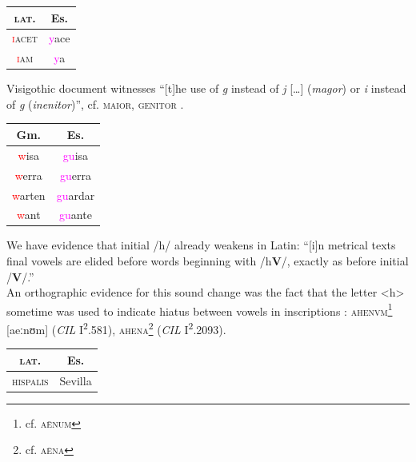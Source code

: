 \documentclass{report}[12pt]
\begin{document}
\begin{tabular}{c c}
  \textsc{lat.} & Es. \\
  \hline
  \textsc{\textcolor{red}{i}acet} & \textcolor{magenta}{y}ace \\
  \textsc{\textcolor{red}{i}am} & \textcolor{magenta}{y}a \\
\end{tabular}

Visigothic document witnesses ``[t]he use of \emph{g} instead of \emph{j} [\dots] (\emph{magor}) or \emph{i} instead of \emph{g} (\emph{inenitor})'', cf. \textsc{maior}, \textsc{genitor} \cite[p.~159]{latin_paleography}.

\begin{tcolorbox}[title=Fortition of /w/ in Germanic Loanwords]
  
\end{tcolorbox}

\begin{tabular}{c c}
  Gm. & Es. \\  
  \hline
  \textcolor{red}{w}isa & \textcolor{magenta}{gu}isa \\
  \textcolor{red}{w}erra & \textcolor{magenta}{gu}erra \\
  \textcolor{red}{w}arten & \textcolor{magenta}{gu}ardar \\
  \textcolor{red}{w}ant & \textcolor{magenta}{gu}ante \\
\end{tabular}

\begin{tcolorbox}[title=Deaspiration]
  
\end{tcolorbox}

We have evidence that initial /h/ already weakens in Latin: ``[i]n metrical texts final vowels are elided before words beginning with /h\textbf{V}/, exactly as before initial /\textbf{V}/.'' \cite[p.~87]{companion_to_latin} \\
An orthographic evidence for this sound change was the fact that the letter <h> sometime was used to indicate hiatus between vowels in inscriptions \cite[p.~18]{companion_to_latin}: \textsc{ahenvm}\footnote{cf. \textsc{a\={e}num}} [aeːnʊm] (\emph{CIL} I\textsuperscript{2}.581), \textsc{ahena}\footnote{cf. \textsc{a\={e}na}} (\emph{CIL} I\textsuperscript{2}.2093).

\begin{tabular}{c c}
  \textsc{lat.} & Es. \\
  \hline
  \textsc{hispalis} & Sevilla
\end{tabular}
\end{document}
